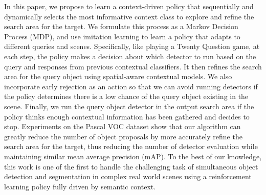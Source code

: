In this paper, we propose to learn a context-driven policy that sequentially and dynamically selects the most informative context class to explore and refine the search area for the target.
We formulate this process as a Markov Decision Process (MDP), and use imitation learning to learn a policy that adapts to different queries and scenes.
Specifically, like playing a Twenty Question game, at each step, the policy makes a decision about which detector to run based on the query and responses from previous contextual classifiers. 
It then refines the search area for the query object using spatial-aware contextual models. We also incorporate early rejection as an action so that we can avoid running detectors if the policy determines there is a low chance of the query object existing in
the scene. Finally, we run the query object detector in the output search area if the policy thinks enough contextual information has been gathered and decides to stop. Experiments on the Pascal VOC dataset show that our algorithm can greatly reduce the number of object proposals by more accurately refine the search area for the target, thus reducing the number of detector evaluation while maintaining similar mean average precision (mAP). To the best of our knowledge, this work is one of the first to handle the challenging task of simultaneous object detection and segmentation in complex real world scenes using a reinforcement learning policy fully driven by semantic context.

